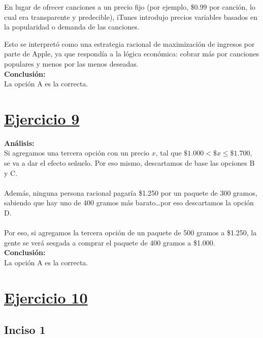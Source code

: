 \documentclass{article}
\newcommand{\ulcolor}[2][Red]{\setulcolor{#1}\ul{#2}}
\begin{document}
        En lugar de ofrecer canciones a un precio fijo (por ejemplo, \$0.99 por canción, lo cual era transparente y predecible), iTunes introdujo precios variables basados en la popularidad o demanda de las canciones.
        
        Esto se interpretó como una estrategia racional de maximización de ingresos por parte de Apple, ya que respondía a la lógica económica: cobrar más por canciones populares y menos por las menos deseadas. \\
        \textbf{Conclusión:} \\
        La opción A es la correcta.
    
    \section*{\ulcolor[Green]{Ejercicio 9}}
        \textbf{Análisis:} \\
        Si agregamos una tercera opción con un precio $x$, tal que $\mathdollar 1.000 < \mathdollar x \leq \mathdollar 1.700$, se va a dar el efecto señuelo. Por eso mismo, descartamos de base las opciones B y C. \\
        \\
        Además, ninguna persona racional pagaría \$1.250 por un paquete de 300 gramos, sabiendo que hay uno de 400 gramos más barato\ldots por eso descartamos la opción D. \\
        \\
        Por eso, si agregamos la tercera opción de un paquete de 500 gramos a \$1.250, la gente se verá sesgada a comprar el paquete de 400 gramos a \$1.000.
        \\
        \textbf{Conclusión:} \\
        La opción A es la correcta.
    \section*{\ulcolor[Green]{Ejercicio 10}}
        \subsection*{Inciso 1}
\end{document}
